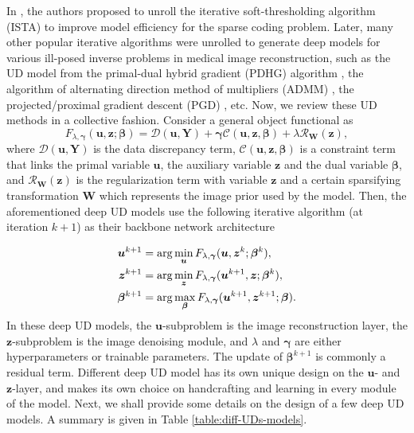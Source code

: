 \documentclass[journal,twoside]{IEEEtran}
\begin{document}
In \cite{gregor2010learning}, the authors proposed to unroll the iterative soft-thresholding algorithm (ISTA) \cite{daubechies2004iterative} to improve model efficiency for the sparse coding problem. Later, many other popular iterative algorithms were unrolled to generate deep models for various ill-posed inverse problems in medical image reconstruction, such as the UD model from the primal-dual hybrid gradient (PDHG) algorithm \cite{adler2018learned,Adler2017Solving}, the algorithm of alternating direction method of multipliers (ADMM) \cite{yang2016deep,yang2017admm,yang2020admm-csnet,he2019optimizing}, the projected/proximal gradient descent (PGD) \cite{gupta2018cnn,Meinhardt_2017learn_prox_op,ding2020low}, etc. Now, we review these UD methods in a collective fashion. 
Consider a general object functional as
$$F_{\lambda,\bm{\gamma}}(\bm{u},\bm{z};\bm{\beta})=\mathcal{D}(\bm{u},\bm{Y})+\bm{\gamma}\mathcal{C}(\bm{u},\bm{z},\bm{\beta})+\lambda \mathcal{R}_{\bm{W}}(\bm{z}),$$
where $ \mathcal{D}(\bm{u},\bm{Y})$ is the data discrepancy term, $\mathcal{C}(\bm{u},\bm{z},\bm{\beta})$ is a constraint term that links the primal variable $\bm{u}$, the auxiliary variable $\bm{z}$ and the dual variable $\bm{\beta}$, and $\mathcal{R}_{\bm{W}}(\bm{z})$ is the regularization term with variable $\bm{z}$ and a certain sparsifying transformation $\bm{W}$ which represents the image prior used by the model. Then, the aforementioned deep UD models use the following iterative algorithm (at iteration $k+1$) as their backbone network architecture

\begin{align}\label{eq:abstract-BCD}
\bm{u}^{k+1}&=\arg\min_{\bm{u}}F_{\lambda,\bm{\gamma}}(\bm{u},\bm{z}^{k};\bm{\beta}^{k}),\notag\\
\bm{z}^{k+1}&=\arg\min_{\bm{z}}F_{\lambda,\bm{\gamma}}(\bm{u}^{k+1},\bm{z};\bm{\beta}^{k}),\notag\\
\bm{\beta}^{k+1}&= \arg\max_{\bm{\beta}}F_{\lambda,\bm{\gamma}}(\bm{u}^{k+1},\bm{z}^{k+1};\bm{\beta}).
\end{align} 
In these deep UD models, the $\bm{u}$-subproblem is the image reconstruction layer, the $\bm{z}$-subproblem is the image denoising module, and $\lambda$ and $\bm{\gamma}$ are either hyperparameters or trainable parameters. The update of $\bm{\beta}^{k+1}$ is commonly a residual term. Different deep UD model has its own unique design on the $\bm{u}$- and $\bm{z}$-layer, and makes its own choice on handcrafting and learning in every module of the model. Next, we shall provide some details on the design of a few deep UD models. A summary is given in Table \ref{table:diff-UDs-models}.
\end{document}
